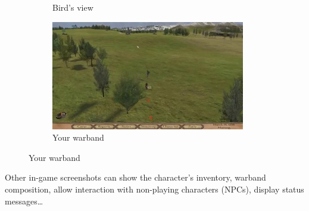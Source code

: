 \documentclass[
]{article}
\begin{document}
\begin{figure}[H]
\begin{subfigure}[b]{0.3\textwidth}
		\caption{Bird's view}
	\end{subfigure}
	\begin{subfigure}[b]{0.3\textwidth}
		\includegraphics[width=\linewidth]{docimages/E_0063_00_17_06.jpg}
		\caption{Your warband}
	\end{subfigure}
\end{figure}


Other in-game screenshots can show the character's inventory, warband
composition, allow interaction with non-playing characters (NPCs), display status
messages\ldots{}
\end{document}
